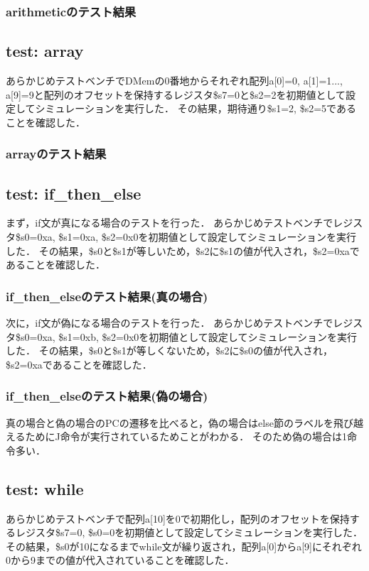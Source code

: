 \documentclass[dvipdfmx]{jsarticle}
\begin{document}
\subsubsection{arithmeticのテスト結果}


\subsection{test: array}
あらかじめテストベンチでDMemの0番地からそれぞれ配列a[0]=0, a[1]=1..., a[9]=9と配列のオフセットを保持するレジスタ\$s7=0と\$s2=2を初期値として設定してシミュレーションを実行した．
その結果，期待通り\$s1=2, \$s2=5であることを確認した．
\subsubsection{arrayのテスト結果}


\subsection{test: if\_then\_else}
まず，if文が真になる場合のテストを行った．
あらかじめテストベンチでレジスタ\$s0=0xa, \$s1=0xa, \$s2=0x0を初期値として設定してシミュレーションを実行した．
その結果，\$s0と\$s1が等しいため，\$s2に\$s1の値が代入され，\$s2=0xaであることを確認した．
\subsubsection{if\_then\_elseのテスト結果(真の場合)}

次に，if文が偽になる場合のテストを行った．
あらかじめテストベンチでレジスタ\$s0=0xa, \$s1=0xb, \$s2=0x0を初期値として設定してシミュレーションを実行した．
その結果，\$s0と\$s1が等しくないため，\$s2に\$s0の値が代入され，\$s2=0xaであることを確認した．
\subsubsection{if\_then\_elseのテスト結果(偽の場合)}

真の場合と偽の場合のPCの遷移を比べると，偽の場合はelse節のラベルを飛び越えるためにJ命令が実行されているためことがわかる．
そのため偽の場合は1命令多い．

\subsection{test: while}
あらかじめテストベンチで配列a[10]を0で初期化し，配列のオフセットを保持するレジスタ\$s7=0, \$s0=0を初期値として設定してシミュレーションを実行した．
その結果，\$s0が10になるまでwhile文が繰り返され，配列a[0]からa[9]にそれぞれ0から9までの値が代入されていることを確認した．
\end{document}

